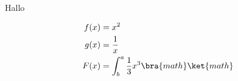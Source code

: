 \documentclass{article}
\begin{document}
    Hallo

    \begin{align*}
      f(x) &= x^2\\
      g(x) &= \frac{1}{x}\\
      F(x) &= \int^a_b \frac{1}{3}x^3

      \bra{math}
      \ket{math}
    \end{align*}
  
\end{document}
